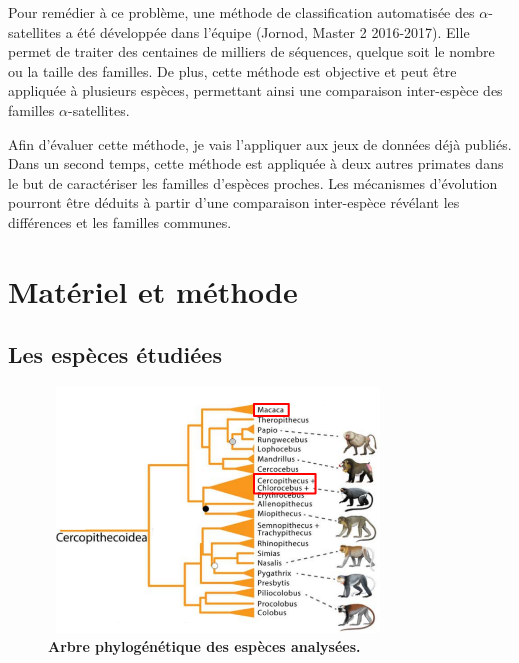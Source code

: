 \documentclass[12pt,a4paper]{article}
\begin{document}
Pour remédier à ce problème, une méthode de classification automatisée des $\alpha$-satellites a été développée dans l'équipe (Jornod, Master 2 2016-2017). Elle permet de traiter des centaines de milliers de séquences, quelque soit le nombre ou la taille des familles. De plus, cette méthode est objective et peut être appliquée à plusieurs espèces, permettant ainsi une comparaison inter-espèce des familles $\alpha$-satellites. 

Afin d'évaluer cette méthode, je  vais l'appliquer aux jeux de données déjà publiés. Dans un second temps, cette méthode est appliquée à deux autres primates dans le but de  caractériser les familles d'espèces proches. Les mécanismes d'évolution pourront être déduits à partir d'une comparaison inter-espèce révélant les différences et les familles communes.

\section{Matériel et méthode}
\subsection{Les espèces étudiées}

	\begin{figure}
		\center
		\includegraphics[height=6.5cm, width=9cm]{img/arbre_presentation.png}
		\caption{\textbf{Arbre phylogénétique des espèces analysées.}\cite{Springer2012}
		\label{fig:arbre_presentation}}
	\end{figure}
\end{document}

